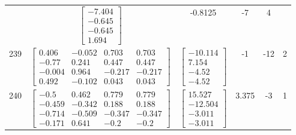 \documentclass[a4paper,12pt]{article}
\begin{document}
\begin{tabular}{c c c c c c}
&
$\begin{bmatrix} -7.404 \\ -0.645 \\ -0.645 \\ 1.694 \end{bmatrix}$
&
-0.8125
&
-7
&
4
\\
239
&
$\begin{bmatrix} 0.406 & -0.052 & 0.703 & 0.703 \\ -0.77 & 0.241 & 0.447 & 0.447 \\ -0.004 & 0.964 & -0.217 & -0.217 \\ 0.492 & -0.102 & 0.043 & 0.043 \end{bmatrix}$
&
$\begin{bmatrix} -10.114 \\ 7.154 \\ -4.52 \\ -4.52 \end{bmatrix}$
&
-1
&
-12
&
2
\\
240
&
$\begin{bmatrix} -0.5 & 0.462 & 0.779 & 0.779 \\ -0.459 & -0.342 & 0.188 & 0.188 \\ -0.714 & -0.509 & -0.347 & -0.347 \\ -0.171 & 0.641 & -0.2 & -0.2 \end{bmatrix}$
&
$\begin{bmatrix} 15.527 \\ -12.504 \\ -3.011 \\ -3.011 \end{bmatrix}$
&
3.375
&
-3
&
1
\\
\end{tabular} \egroup \newpage
\end{document}
